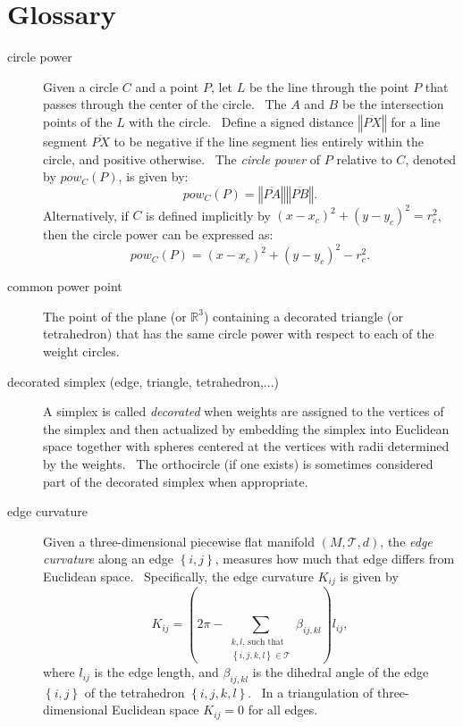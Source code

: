                       

\chapter{Glossary}

\begin{description}
\item[circle power] Given a circle $C$ and a point $P$, let $L$ be the line
through the point $P$ that passes through the center of the circle. \ The $A$
and $B$ be the intersection points of the $L$ with the circle. \ Define a
signed distance $\left\Vert \overline{PX}\right\Vert $ for a line segment $%
\overline{PX}$ to be negative if the line segment lies entirely within the
circle, and positive otherwise. \ The \textit{circle power} of $P$ relative
to $C$, denoted by $pow_{C}\left( P\right) $, is given by:%
\begin{equation*}
pow_{C}\left( P\right) =\left\Vert \overline{PA}\right\Vert \left\Vert 
\overline{PB}\right\Vert .
\end{equation*}%
Alternatively, if $C$ is defined implicitly by $\left( x-x_{c}\right)
^{2}+\left( y-y_{c}\right) ^{2}=r_{c}^{2}$, then the circle power can be
expressed as:%
\begin{equation*}
pow_{C}\left( P\right) =\left( x-x_{c}\right) ^{2}+\left( y-y_{c}\right)
^{2}-r_{c}^{2}.
\end{equation*}

\item[common power point] The point of the plane (or $%
\mathbb{R}
^{3}$) containing a decorated triangle (or tetrahedron) that has the same
circle power with respect to each of the weight circles. \ 

\item[decorated simplex (edge, triangle, tetrahedron,...)] A simplex is
called \textit{decorated} when weights are assigned to the vertices of the
simplex and then actualized by embedding the simplex into Euclidean space
together with spheres centered at the vertices with radii determined by the
weights. \ The orthocircle (if one exists) is sometimes considered part of
the decorated simplex when appropriate.

\item[edge curvature] Given a three-dimensional piecewise flat manifold $%
\left( M,\mathcal{T},d\right) $, the \textit{edge curvature} along an edge $%
\left\{ i,j\right\} $, measures how much that edge differs from Euclidean
space. \ Specifically, the edge curvature $K_{ij}$ is given by 
\begin{equation*}
K_{ij}=\left( 2\pi -\sum\limits_{\substack{ k,l\text{, such that} \\ \left\{
i,j,k,l\right\} \in \mathcal{T}}}\beta _{ij,kl}\right) l_{ij},
\end{equation*}%
where $l_{ij}$ is the edge length, and $\beta _{ij,kl}$ is the dihedral
angle of the edge $\left\{ i,j\right\} $ of the tetrahedron $\left\{
i,j,k,l\right\} $. \ In a triangulation of three-dimensional Euclidean space 
$K_{ij}=0$ for all edges. \ 


\end{description}
